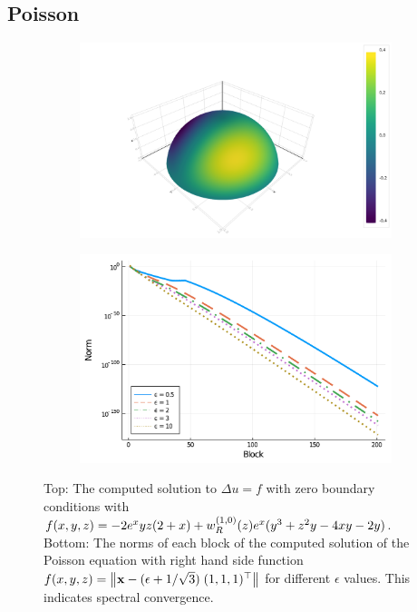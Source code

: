 \documentclass[11pt, oneside]{article}   	%
\begin{document}
\subsection{Poisson}


\begin{figure}[tp]
	\centering
	\begin{subfigure}{0.85\textwidth}
		\includegraphics[scale=0.4]{poisson-u=wyexpx-N=60}
	\end{subfigure}
	\hfill%
	
	\begin{subfigure}{0.55\textwidth}
		\includegraphics[scale=0.4]{solutionblocknorms-poisson-epsilonfun-N=200}
	\end{subfigure}
	\hfill%
	\caption{Top: The computed solution to $\Delta u = f$ with zero boundary conditions with $f(x,y,z) = - 2 e^x y z (2+x) + w_R^{(1,0)}(z) e^x (y^3 + z^2 y - 4xy - 2y)$. Bottom: The norms of each block of the computed solution of the Poisson equation with right hand side function $f(x,y,z) = \left\| \mathbf{x} - (\epsilon + 1 / \sqrt{3}) \; (1,1,1)^\top  \right\|$ for different $\epsilon$ values. This indicates spectral convergence.}
	\label{fig:poisson}
\end{figure}
\end{document}
